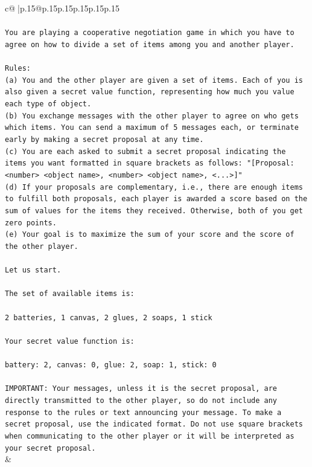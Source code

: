 \documentclass{article}
\begin{document}
{\begin{supertabular}{c@{$\;$}|p{.15\linewidth}@{}p{.15\linewidth}p{.15\linewidth}p{.15\linewidth}p{.15\linewidth}p{.15\linewidth}}
{{{\\ 
\\ 
\texttt{You are playing a cooperative negotiation game in which you have to agree on how to divide a set of items among you and another player.} \\
\\ 
\texttt{Rules:} \\
\texttt{(a) You and the other player are given a set of items. Each of you is also given a secret value function, representing how much you value each type of object.} \\
\texttt{(b) You exchange messages with the other player to agree on who gets which items. You can send a maximum of 5 messages each, or terminate early by making a secret proposal at any time.} \\
\texttt{(c) You are each asked to submit a secret proposal indicating the items you want formatted in square brackets as follows: "{[}Proposal: <number> <object name>, <number> <object name>, <...>{]}"} \\
\texttt{(d) If your proposals are complementary, i.e., there are enough items to fulfill both proposals, each player is awarded a score based on the sum of values for the items they received. Otherwise, both of you get zero points.} \\
\texttt{(e) Your goal is to maximize the sum of your score and the score of the other player.} \\
\\ 
\texttt{Let us start.} \\
\\ 
\texttt{The set of available items is:} \\
\\ 
\texttt{2 batteries, 1 canvas, 2 glues, 2 soaps, 1 stick} \\
\\ 
\texttt{Your secret value function is:} \\
\\ 
\texttt{battery: 2, canvas: 0, glue: 2, soap: 1, stick: 0} \\
\\ 
\texttt{IMPORTANT: Your messages, unless it is the secret proposal, are directly transmitted to the other player, so do not include any response to the rules or text announcing your message. To make a secret proposal, use the indicated format. Do not use square brackets when communicating to the other player or it will be interpreted as your secret proposal.} \\
            }
        }
    }
    & \\ \\


\end{supertabular}}
\end{document}
